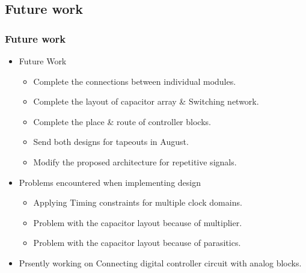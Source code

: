 \documentclass{beamer}
\begin{document}
\subsection*{Future work}
\begin{frame}
	\frametitle{Future work} \footnotesize
	\begin{itemize} 
		\item{ Future Work}
			\begin{itemize} \scriptsize
			\item{ Complete the connections between individual modules. }\\
			\item{ Complete the layout of capacitor array \& Switching network. } \\ 
			\item{ Complete the place \& route of controller blocks. }
			\item{ Send both designs for tapeouts in August.} \\
			\item{ Modify the proposed architecture for repetitive signals.} \\
			\end{itemize}
		\item{ Problems encountered when implementing design}
			\begin{itemize} \scriptsize
			\item{ Applying Timing constraints for multiple clock domains. } \\
			\item{ Problem with the capacitor layout because of multiplier. } \\ 
			\item{ Problem with the capacitor layout because of parasitics. } \\ 
			\end{itemize}
		\item{ Prsently working on Connecting digital controller circuit with analog blocks.}
	\end{itemize}
\end{frame}
\end{document}
